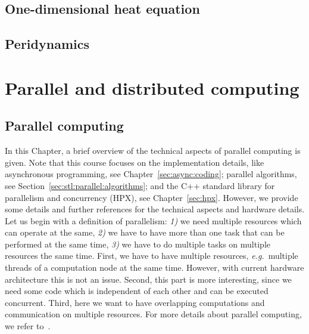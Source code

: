 \documentclass[11pt,fleqn]{book} %
\begin{document}
\chapter{One-dimensional heat equation}

\chapter{Peridynamics}
\label{sec:pd}

\part{Parallel and distributed computing}

\chapter{Parallel computing}
In this Chapter, a brief overview of the technical aspects of parallel computing is given. Note that this course focuses on the implementation details, like asynchronous programming, see Chapter~\ref{sec:async:coding}; parallel algorithms, see Section~\ref{sec:stl:parallel:algorithms}; and the C++ standard library for parallelism and concurrency (HPX), see Chapter~\ref{sec:hpx}. However, we provide some details and further references for the technical aspects and hardware details.\\

Let us begin with a definition of parallelism: \textit{1)} we need multiple resources which can operate at the same, \textit{2)} we have to have more than one task that can be performed at the same time, \textit{3)} we have to do multiple tasks on multiple resources the same time. First, we have to have multiple resources, \emph{e.g.}\ multiple threads of a computation node at the same time. However, with current hardware architecture this is not an issue. Second, this part is more interesting, since we need some code which is independent of each other and can be executed concurrent. Third, here we want to have overlapping computations and communication on multiple resources. For more details about parallel computing, we refer to~\cite{grama2003introduction,trobec2018introduction}.\\
\end{document}
